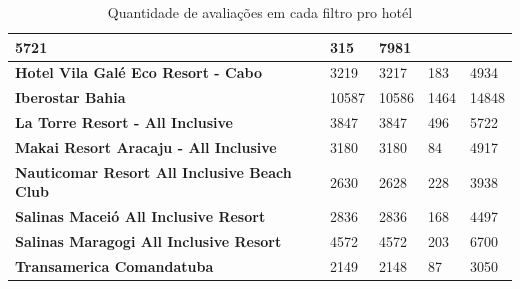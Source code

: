 \begin{table}[]
\begin{tabular}{|p{5cm}|l|l|l|l|}
		5721                                                &
		315                                                 &
		7981                                                  \\
		\hline
		\textbf{Hotel Vila Galé Eco Resort - Cabo}          &
		3219                                                &
		3217                                                &
		183                                                 &
		4934                                                  \\
		\hline
		\textbf{Iberostar Bahia}                            &
		10587                                               &
		10586                                               &
		1464                                                &
		14848                                                 \\
		\hline
		\textbf{La Torre Resort - All Inclusive}            &
		3847                                                &
		3847                                                &
		496                                                 &
		5722                                                  \\
		\hline
		\textbf{Makai Resort Aracaju - All Inclusive}       &
		3180                                                &
		3180                                                &
		84                                                  &
		4917                                                  \\
		\hline
		\textbf{Nauticomar Resort All Inclusive Beach Club} &
		2630                                                &
		2628                                                &
		228                                                 &
		3938                                                  \\
		\hline
		\textbf{Salinas Maceió All Inclusive Resort}        &
		2836                                                &
		2836                                                &
		168                                                 &
		4497                                                  \\
		\hline
		\textbf{Salinas Maragogi All Inclusive Resort}      &
		4572                                                &
		4572                                                &
		203                                                 &
		6700                                                  \\
		\hline
		\textbf{Transamerica Comandatuba}                   &
		2149                                                &
		2148                                                &
		87                                                  &
		3050                                                  \\ \hline
	\end{tabular}
	\caption{Quantidade de avaliações em cada filtro pro hotél}
	\label{table:qtd_review_filtro}
\end{table}

